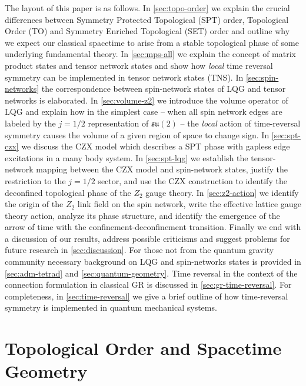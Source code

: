 \documentclass[preprint]{SciPost}
\newcommand{\mf}[1]{\mathfrak{#1}}
\theoremstyle{plain} %
\begin{document}
The layout of this paper is as follows. In \autoref{sec:topo-order} we explain the crucial differences between Symmetry Protected Topological (SPT) order, Topological Order (TO) and Symmetry Enriched Topological (SET) order and outline why we expect our classical spacetime to arise from a stable topological phase of some underlying fundamental theory. In \autoref{sec:mps-all} we explain the concept of matrix product states and tensor network states and show how \emph{local} time reversal symmetry can be implemented in tensor network states (TNS). In \autoref{sec:spin-networks} the correspondence between spin-network states of LQG and tensor networks is elaborated. In \autoref{sec:volume-z2} we introduce the volume operator of LQG and explain how in the simplest case -- when all spin network edges are labeled by the $ j=1/2 $ representation of $ \mf{su}(2) $ -- the \emph{local} action of time-reversal symmetry causes the volume of a given region of space to change sign. In \autoref{sec:spt-czx} we discuss the CZX model which describes a SPT phase with gapless edge excitations in a many body system. In \autoref{sec:spt-lqg} we establish the tensor-network mapping between the CZX model and spin-network states, justify the restriction to the $ j = 1/2 $ sector, and use the CZX construction to identify the deconfined topological phase of the $ Z_2 $ gauge theory. In \autoref{sec:z2-action} we identify the origin of the $ Z_2 $ link field on the spin network, write the effective lattice gauge theory action, analyze its phase structure, and identify the emergence of the arrow of time with the confinement-deconfinement transition. Finally we end with a discussion of our results, address possible criticisms and suggest problems for future research in \autoref{sec:discussion}. For those not from the quantum gravity community necessary background on LQG and spin-networks states is provided in \autoref{sec:adm-tetrad} and \autoref{sec:quantum-geometry}. Time reversal in the context of the connection formulation in classical GR is discussed in \autoref{sec:gr-time-reversal}. For completeness, in \autoref{sec:time-reversal} we give a brief outline of how time-reversal symmetry is implemented in quantum mechanical systems.

\section{Topological Order and Spacetime Geometry}\label{sec:topo-order}
\end{document}
